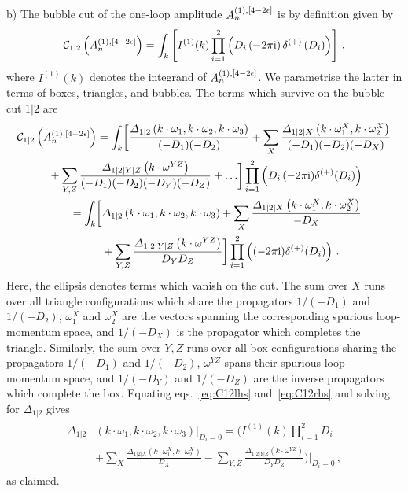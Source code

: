 \smallskip
\noindent
b) The bubble cut of the one-loop amplitude $A^{(1),[4-2\epsilon]}_n$ is by definition given by
\begin{align} \label{eq:C12lhs}
\mathcal{C}_{1|2} \left(A^{(1),[4-2\epsilon]}_n\right) = \int_k \left[ I^{(1)}(k) \prod_{i=1}^2 \left( D_i \, (-2 \pi \mathrm{i}) \, \delta^{(+)}\left(D_i\right) \right) \right] \,,
\end{align}
where $I^{(1)}(k)$ denotes the integrand of $A^{(1),[4-2\epsilon]}_n$. We parametrise the latter in terms of boxes, triangles, and bubbles.
The terms which survive on the bubble cut $1|2$ are
\begin{align}
& \mathcal{C}_{1|2} \left(A^{(1),[4-2\eps]}_n\right) = \int_k \biggl[ \frac{\Delta_{1|2}\left(k\cdot \omega_1, k\cdot \omega_2, k\cdot \omega_3\right)}{(-D_1)(-D_2)} + \sum_X \frac{\Delta_{1|2|X}\left( k \cdot \omega^X_1, k\cdot \omega^X_2 \right)}{(-D_1)(-D_2)(-D_X)}  \nonumber \\
& \hspace{1cm} + \sum_{Y,Z} \frac{\Delta_{1|2|Y|Z}\left( k \cdot \omega^{YZ} \right)}{(-D_1)(-D_2)(-D_Y) (-D_Z)} + \ldots \biggr]  \prod_{i=1}^2 \left( D_i \, (-2 \pi \i ) \delta^{(+)}(D_i)\right)   \nonumber \\
& \phantom{\mathcal{C}_{1|2} \left(A^{(1)}\right)} = \int_k \biggl[ \Delta_{1|2}\left(k\cdot \omega_1, k\cdot \omega_2, k\cdot \omega_3\right) + \sum_X \frac{\Delta_{1|2|X}\left( k \cdot \omega^X_1, k\cdot \omega^X_2 \right)}{-D_X} \nonumber \\
&  \phantom{\mathcal{C}_{1|2} \left(A^{(1)}\right) = \int_k \biggl[} + \sum_{Y,Z} \frac{\Delta_{1|2|Y|Z}\left( k \cdot \omega^{YZ} \right)}{D_Y D_Z} \biggr] \prod_{i=1}^2 \left( (-2 \pi \i ) \delta^{(+)}(D_i)\right) \,. \label{eq:C12rhs}
\end{align}
Here, the ellipsis denotes terms which vanish on the cut. The sum over $X$ runs over all triangle configurations which share the propagators $1/(-D_1)$ and $1/(-D_2)$, $\omega_1^X$ and $\omega_2^X$ are the vectors spanning the corresponding spurious loop-momentum space, and $1/(-D_X)$ is the propagator which completes the triangle. Similarly, the sum over $Y,Z$ runs over all box configurations sharing the propagators $1/(-D_1)$ and $1/(-D_2)$, $\omega^{YZ}$ spans their spurious-loop momentum space, and $1/(-D_Y)$ and $1/(-D_Z)$ are the inverse propagators which complete the box. Equating eqs.~\eqref{eq:C12lhs} and~\eqref{eq:C12rhs} and solving for $\Delta_{1|2}$ gives
\begin{align}
\begin{aligned}
  \Delta_{1|2}&\left(k\cdot \omega_1, k\cdot \omega_2, k\cdot \omega_3\right) \biggl|_{D_i=0} = \biggl(
    I^{(1)}(k) \prod_{i=1}^2 D_i \\
  &  + \sum_X \frac{\Delta_{1|2|X}\left( k \cdot \omega^X_1, k\cdot \omega^X_2 \right)}{D_X}
- \sum_{Y,Z} \frac{\Delta_{1|2|Y|Z}\left( k \cdot \omega^{YZ} \right)}{D_Y D_Z} \biggr) \biggl|_{D_i=0} \,,
\end{aligned}
\end{align}
as claimed.

